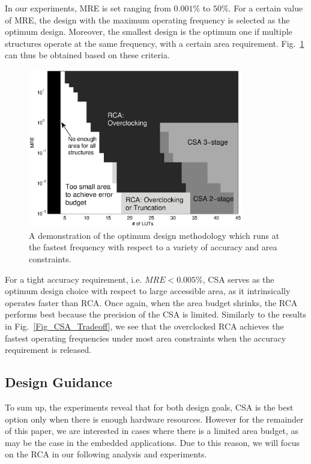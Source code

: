 \documentclass[prodmode,acmtrets]{acmsmall} %
\begin{document}
In our experiments, MRE is set ranging from $0.001\%$ to $50\%$. For a certain value of MRE, the design with the maximum operating frequency is selected as the optimum design. Moreover, the smallest design is the optimum one if multiple structures operate at the same frequency, with a certain area requirement. Fig.~\ref{Fig_CSA_Tradeoff_Error} can thus be obtained based on these criteria.

\begin{figure}[t]
    \centering
    \includegraphics[width=3.7in]{./Figures/Tradeoff_Error.eps}
    \caption{A demonstration of the optimum design methodology which runs at the fastest frequency with respect to a variety of accuracy and area constraints.}
    \label{Fig_CSA_Tradeoff_Error}
\end{figure}

For a tight accuracy requirement, i.e. $MRE<0.005\%$, CSA serves as the optimum design choice with respect to large accessible area, as it intrinsically operates faster than RCA. Once again, when the area budget shrinks, the RCA performs best because the precision of the CSA is limited. Similarly to the results in Fig.~\ref{Fig_CSA_Tradeoff}, we see that the overclocked RCA achieves the fastest operating frequencies under most area constraints when the accuracy requirement is released.

\subsection{Design Guidance}
To sum up, the experiments reveal that for both design goals, CSA is the best option only when there is enough hardware resources. However for the remainder of this paper, we are interested in cases where there is a limited area budget, as may be the case in the embedded applications. Due to this reason, we will focus on the RCA in our following analysis and experiments.
\end{document}
